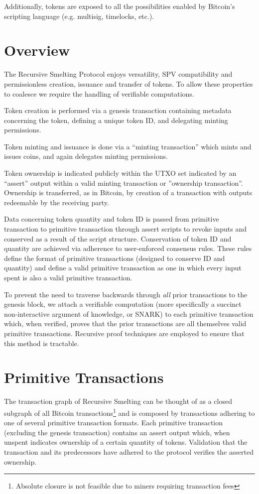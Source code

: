 \documentclass[9pt,oneside]{amsart}
\begin{document}
\begin{multicols}{2}
Additionally, tokens are exposed to all the possibilities enabled by Bitcoin's scripting language  (e.g. multisig, timelocks, etc.).

\section{Overview}
The Recursive Smelting Protocol enjoys versatility, SPV compatibility and permissionless creation, issuance and transfer of tokens. To allow these properties to coalesce we require the handling of verifiable computations.

Token creation is performed via a genesis transaction containing metadata concerning the token, defining a unique token ID, and delegating minting permissions.

Token minting and issuance is done via a ``minting transaction'' which mints and issues coins, and again delegates minting permissions.

Token ownership is indicated publicly within the UTXO set indicated by an ``assert'' output within a valid minting transaction or ''ownership transaction''. Ownership is transferred, as in Bitcoin, by creation of a transaction with outputs redeemable by the receiving party.


Data concerning token quantity and token ID is passed from primitive transaction to primitive transaction through assert scripts to revoke inputs and conserved as a result of the script structure. Conservation of token ID and quantity are achieved via adherence to user-enforced consensus rules. These rules define the format of primitive transactions (designed to conserve ID and quantity) and define a valid primitive transaction as one in which every input spent is also a valid primitive transaction.

To prevent the need to traverse backwards through \emph{all} prior transactions to the genesis block, we attach a verifiable computation (more specifically a succinct non-interactive argument of knowledge, or SNARK) to each primitive transaction which, when verified, proves that the prior transactions are all themselves valid primitive transactions. Recursive proof techniques are employed to ensure that this method is tractable.

\section{Primitive Transactions}\label{sec:primtrans}
The transaction graph of Recursive Smelting can be thought of as a closed subgraph of all Bitcoin transactions\footnote{Absolute closure is not feasible due to miners requiring transaction fees} and is composed by transactions adhering to one of several primitive transaction formats. Each primitive transaction (excluding the genesis transaction) contains an assert output which, when unspent indicates ownership of a certain quantity of tokens. Validation that the transaction and its predecessors have adhered to the protocol verifies the asserted ownership.


\end{multicols}
\end{document}
